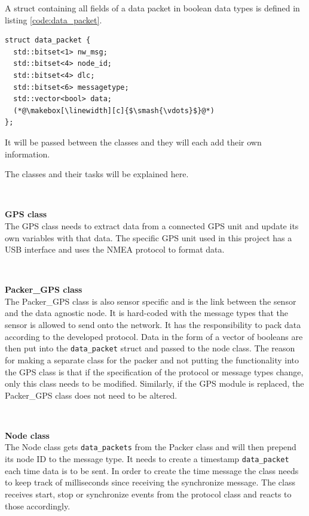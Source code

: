 A struct containing all fields of a data packet in boolean data types is defined in listing \ref{code:data_packet}.  

\begin{lstlisting}[caption=Struct for data packet.,label=code:data_packet]
struct data_packet {
  std::bitset<1> nw_msg;
  std::bitset<4> node_id;
  std::bitset<4> dlc;
  std::bitset<6> messagetype;
  std::vector<bool> data; 
  (*@\makebox[\linewidth][c]{$\smash{\vdots}$}@*)
};
\end{lstlisting}
It will be passed between the classes and they will each add their own information. 

The classes and their tasks will be explained here.

~\\ \par \textbf{GPS class} ~ \\
The GPS class needs to extract data from a connected GPS unit and update its own variables with that data.
The specific GPS unit used in this project has a USB interface and uses the NMEA protocol to format data.

~\\ \par \textbf{Packer\_GPS class} ~ \\
The Packer\_GPS class is also sensor specific and is the link between the sensor and the data agnostic node.
It is hard-coded with the message types that the sensor is allowed to send onto the network.
It has the responsibility to pack data according to the developed protocol.
Data in the form of a vector of booleans are then put into the \texttt{data\_packet} struct and passed to the node class.
The reason for making a separate class for the packer and not putting the functionality into the GPS class is that if the specification of the protocol or message types change, only this class needs to be modified.
Similarly, if the GPS module is replaced, the Packer\_GPS class does not need to be altered.

~\\ \par \textbf{Node class} ~ \\
The Node class gets \texttt{data\_packets} from the Packer class and will then prepend its node ID to the message type.
It needs to create a timestamp \texttt{data\_packet} each time data is to be sent.
In order to create the time message the class needs to keep track of milliseconds since receiving the synchronize message.
The class receives start, stop or synchronize events from the protocol class and reacts to those accordingly.

